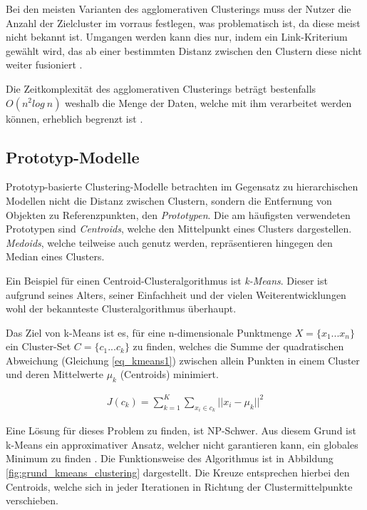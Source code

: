 Bei den meisten Varianten des agglomerativen Clusterings muss der Nutzer die Anzahl der Zielcluster im
vorraus festlegen, was problematisch ist, da diese meist nicht bekannt ist. Umgangen werden kann dies nur,
indem ein Link-Kriterium gewählt wird, das ab einer bestimmten Distanz zwischen den Clustern diese nicht weiter
fusioniert \cite[]{GeorgeSeif2018}.

Die Zeitkomplexität des agglomerativen Clusterings beträgt bestenfalls $O(n^2log\ n)$ weshalb die Menge der Daten,
welche mit ihm verarbeitet werden können, erheblich begrenzt ist \cite[]{tan2007introduction}.

\subsection{Prototyp-Modelle}
\label{sec:grund_prototype_clustering}

Prototyp-basierte Clustering-Modelle betrachten im Gegensatz zu hierarchischen Modellen nicht die Distanz
zwischen Clustern, sondern die Entfernung von Objekten zu Referenzpunkten, den \textit{Prototypen}.
Die am häufigsten verwendeten Prototypen sind \textit{Centroids}, welche den Mittelpunkt eines Clusters dargestellen.
\textit{Medoids}, welche teilweise auch genutz werden, repräsentieren hingegen den Median eines Clusters. \cite[]{tan2007introduction}

Ein Beispiel für einen Centroid-Clusteralgorithmus ist \textit{k-Means}. Dieser ist aufgrund seines Alters,
seiner Einfachheit und der vielen Weiterentwicklungen wohl der bekannteste Clusteralgorithmus überhaupt.

Das Ziel von k-Means ist es, für eine n-dimensionale Punktmenge $X = \{ x_1 ... x_n \}$ ein Cluster-Set $C = \{ c_1 ... c_k \}$
zu finden, welches die Summe der quadratischen Abweichung (Gleichung \ref{eq_kmeans1}) zwischen allein Punkten in einem Cluster und deren
Mittelwerte $\mu_k$ (Centroids) minimiert.

\begin{ceqn}
\begin{align}
    \label{eq_kmeans1}
    J(c_k) = \sum_{k=1}^K \sum_{x_i \in c_k} || x_i - \mu_k ||^2
\end{align}
\end{ceqn}

Eine Lösung für dieses Problem zu finden, ist NP-Schwer. Aus diesem Grund
ist k-Means ein approximativer Ansatz, welcher nicht garantieren kann, ein globales Minimum zu finden \cite[]{Jain2010}.
Die Funktionsweise des Algorithmus ist in Abbildung \ref{fig:grund_kmeans_clustering} dargestellt.
Die Kreuze entsprechen hierbei den Centroids, welche sich in jeder Iterationen in Richtung der
Clustermittelpunkte verschieben.

